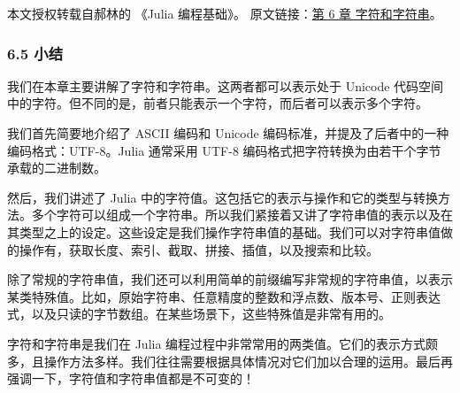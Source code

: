 
本文授权转载自郝林的 《Julia 编程基础》。 原文链接：\href{https://github.com/hyper0x/JuliaBasics/blob/master/book/ch06.md}{第 6 章 字符和字符串}。


\subsubsection{6.5 小结}

我们在本章主要讲解了字符和字符串。这两者都可以表示处于 Unicode 代码空间中的字符。但不同的是，前者只能表示一个字符，而后者可以表示多个字符。

我们首先简要地介绍了 ASCII 编码和 Unicode 编码标准，并提及了后者中的一种编码格式：UTF-8。Julia 通常采用 UTF-8 编码格式把字符转换为由若干个字节承载的二进制数。

然后，我们讲述了 Julia 中的字符值。这包括它的表示与操作和它的类型与转换方法。多个字符可以组成一个字符串。所以我们紧接着又讲了字符串值的表示以及在其类型之上的设定。这些设定是我们操作字符串值的基础。我们可以对字符串值做的操作有，获取长度、索引、截取、拼接、插值，以及搜索和比较。

除了常规的字符串值，我们还可以利用简单的前缀编写非常规的字符串值，以表示某类特殊值。比如，原始字符串、任意精度的整数和浮点数、版本号、正则表达式，以及只读的字节数组。在某些场景下，这些特殊值是非常有用的。

字符和字符串是我们在 Julia 编程过程中非常常用的两类值。它们的表示方式颇多，且操作方法多样。我们往往需要根据具体情况对它们加以合理的运用。最后再强调一下，字符值和字符串值都是不可变的！
